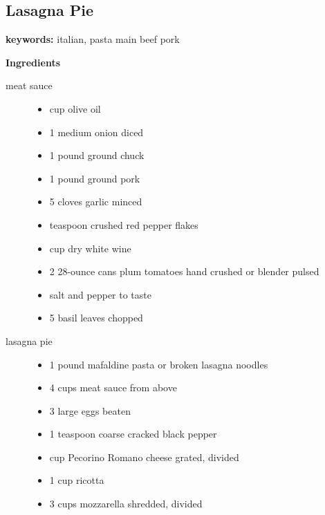 \documentclass[web-recipes.tex]{subfiles}
\begin{document}
\renewcommand{\mytitle}{Lasagna Pie}
\renewcommand{\myurl}{https://www.sipandfeast.com/lasagna-pie/}
\begin{mdframed}[nobreak]
  \section{\mytitle}
  {\sffamily\footnotesize \textbf{keywords:}
  italian,
pasta
main
beef
pork
}
  \vspace{0.5ex}

  \begin{minipage}[t]{0.35\textwidth}
    {\sffamily\bfseries Ingredients}\vspace{0.5ex}
    \begin{description}
      \item[meat sauce] \hfill
        \begin{itemize}
          \item {} cup olive oil
          \item 1 medium onion diced
          \item 1 pound ground chuck
          \item 1 pound ground pork
          \item 5 cloves garlic minced
          \item {} teaspoon crushed red pepper flakes
          \item {} cup dry white wine
          \item 2 28-ounce cans plum tomatoes hand crushed or blender pulsed
          \item salt and pepper to taste
          \item 5 basil leaves chopped
        \end{itemize}
      \item[lasagna pie] \hfill
        \begin{itemize}
          \item 1 pound mafaldine pasta or broken lasagna noodles
          \item 4 cups meat sauce from above
          \item 3 large eggs beaten
          \item 1 teaspoon coarse cracked black pepper
          \item {} cup Pecorino Romano cheese grated, divided
          \item 1 cup ricotta
          \item 3 cups mozzarella shredded, divided

\end{itemize}
\end{description}
\end{minipage}
\end{mdframed}
\end{document}
